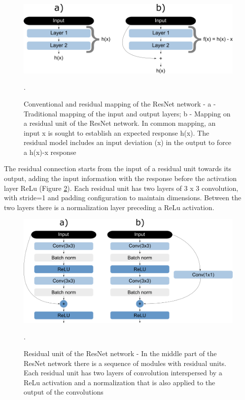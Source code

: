 \begin{figure}
    \centering
    \includegraphics[scale=0.4]{Part 3 - Learning Systems/Supervised Learning/Deep Learning/images/figure136.png}
    \caption{Conventional and residual mapping of the ResNet network - a - Traditional mapping of the input and output layers; b - Mapping on a residual unit of the ResNet network. In common mapping, an input x is sought to establish an expected response h(x). The residual model includes an input deviation (x) in the output to force a h(x)-x response \cite{geron2019}}.
    \label{fig:figure136}
\end{figure}

The residual connection starts from the input of a residual unit towards its output, adding the input information with the response before the activation layer ReLu (Figure  \ref{fig:figure137}). Each residual unit has two layers of 3 x 3 convolution, with stride=1 and padding configuration to maintain dimensions. Between the two layers there is a normalization layer preceding a ReLu activation.

\begin{figure}
    \centering
    \includegraphics[scale=0.4]{Part 3 - Learning Systems/Supervised Learning/Deep Learning/images/figure137.png}
    \caption{Residual unit of the ResNet network - In the middle part of the ResNet network there is a sequence of modules with residual units. Each residual unit has two layers of convolution interspersed by a ReLu activation and a normalization that is also applied to the output of the convolutions \cite{geron2019}}.
    \label{fig:figure137}
\end{figure}

